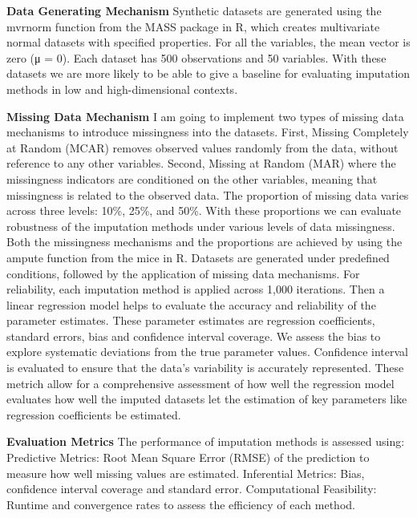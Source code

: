 \documentclass[10pt, a4paper]{article}
\begin{document}
\textbf{Data Generating Mechanism 
}
Synthetic datasets are generated using the mvrnorm function from the MASS package in R, which creates multivariate normal datasets with specified properties. For all the variables, the mean vector is zero (μ = 0). Each dataset has 500 observations and 50 variables. With these datasets we are more likely to be able to give a baseline for evaluating imputation methods in low and high-dimensional contexts. 

\textbf{Missing Data Mechanism
}
I am going to implement two types of missing data mechanisms to introduce missingness into the datasets. First, Missing Completely at Random (MCAR) removes observed values randomly from the data, without reference to any other variables. Second, Missing at Random (MAR) where the missingness indicators are conditioned on the other variables, meaning that missingness is related to the observed data. The proportion of missing data varies across three levels: 10\%, 25\%, and 50\%. With these proportions we can evaluate robustness of the imputation methods under various levels of data missingness. Both the missingness mechanisms and the proportions are achieved by using the ampute function from the mice in R. Datasets are generated under predefined conditions, followed by the application of missing data mechanisms. For reliability, each imputation method is applied across 1,000 iterations. Then a linear regression model helps to evaluate the accuracy and reliability of the parameter estimates. These parameter estimates are regression coefficients, standard errors, bias and confidence interval coverage. We assess the bias to explore systematic deviations from the true parameter values. Confidence interval is evaluated to ensure that the data’s variability is accurately represented. These metrich allow for a comprehensive assessment of how well the regression model evaluates how well the imputed datasets let the estimation of key parameters like regression coefficients be estimated. 

\textbf{Evaluation Metrics 
}
The performance of imputation methods is assessed using: Predictive Metrics: Root Mean Square Error (RMSE) of the prediction to measure how well missing values are estimated. Inferential Metrics: Bias, confidence interval coverage and standard error. Computational Feasibility: Runtime and convergence rates to assess the efficiency of each method.  

\newpage

\printbibliography[title=References]
\end{document}
